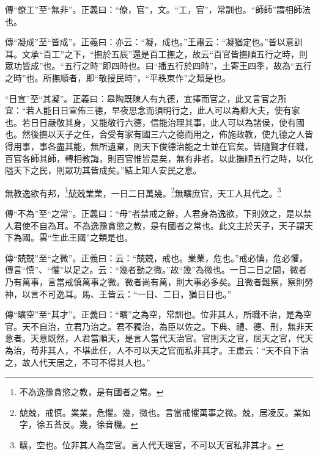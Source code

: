 {\noindent\zhuan{}\fzbyks 傳“僚工”至“無非”。正義曰：“僚，官”，文。“工，官”，常訓也。“師師”謂相師法也。 \par}

{\noindent\zhuan{}\fzbyks 傳“凝成”至“皆成”。正義曰：亦云：“凝，成也。”王肅云：“凝猶定也。”皆以意訓耳。文承“百工”之下，“撫於五辰”還是百工撫之，故云“百官皆撫順五行之時，則眾功皆成”也。“五行之時”即四時也。曰“播五行於四時”，土寄王四季，故為“五行之時”也。所撫順者，即“敬授民時”，“平秩東作”之類是也。 \par}

{\noindent\shu{}\fzkt “日宣”至“其凝”。正義曰：皋陶既陳人有九德，宜擇而官之，此又言官之所宜：“若人能日日宣佈三德，早夜思念而須明行之，此人可以為卿大夫，使有家也。若日日嚴敬其身，又能敬行六德，信能治理其事，此人可以為諸侯，使有國也。然後撫以天子之任，合受有家有國三六之德而用之，佈施政教，使九德之人皆得用事，事各盡其能，無所遺棄，則天下俊德治能之士並在官矣。皆隨賢才任職，百官各師其師，轉相教誨，則百官惟皆是矣，無有非者。以此撫順五行之時，以化隘天下之民，則眾功其皆成矣。”結上知人安民之意。 \par}

無教逸欲有邦，\footnote{不為逸豫貪慾之教，是有國者之常。}兢兢業業，一日二日萬幾。\footnote{兢兢，戒慎。業業，危懼。幾，微也。言當戒懼萬事之微。兢，居凌反。業如字，徐五荅反。幾，徐音機。}無曠庶官，天工人其代之。\footnote{曠，空也。位非其人為空官。言人代天理官，不可以天官私非其才。}


{\noindent\zhuan{}\fzbyks 傳“不為”至“之常”。正義曰：“毋”者禁戒之辭，人君身為逸欲，下則效之，是以禁人君使不自為耳。不為逸豫貪慾之教，是有國者之常也。此文主於天子，天子謂天下為國。雲“生此王國”之類是也。 \par}

{\noindent\zhuan{}\fzbyks 傳“兢兢”至“之微”。正義曰：云：“兢兢，戒也。業業，危也。”戒必慎，危必懼，傳言“慎”、“懼”以足之。云：“幾者動之微。”故“幾”為微也。一日二日之間，微者乃有萬事，言當戒慎萬事之微。微者尚有萬，則大事必多矣。且微者難察，察則勞神，以言不可逸耳。馬、王皆云：“一日、二日，猶日日也。” \par}

{\noindent\zhuan{}\fzbyks 傳“曠空”至“其才”。正義曰：“曠”之為空，常訓也。位非其人，所職不治，是為空官。天不自治，立君乃治之。君不獨治，為臣以佐之。下典、禮、德、刑，無非天意者。天意既然，人君當順天，是言人當代天治官。官則天之官，居天之官，代天為治，苟非其人，不堪此任，人不可以天之官而私非其才。王肅云：“天不自下治之，故人代天居之，不可不得其人也。” \par}

